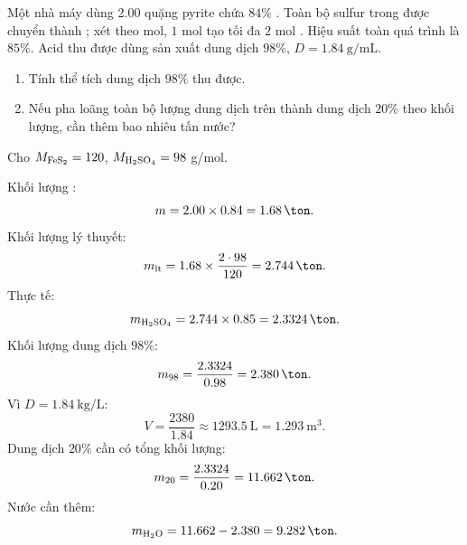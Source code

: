 \begin{tuluyen}
Một nhà máy dùng \SI{2.00}{\ton} quặng pyrite chứa \(84\%\) . Toàn bộ sulfur trong  được chuyển thành ; xét theo mol, \(1\) mol  tạo tối đa \(2\) mol . Hiệu suất toàn quá trình là \(85\%\). Acid thu được dùng sản xuất dung dịch  \(98\%\), \(D=\SI{1.84}{\gram\per\milli\liter}\).
\begin{enumerate}
\item Tính thể tích dung dịch  \(98\%\) thu được.
\item Nếu pha loãng toàn bộ lượng dung dịch trên thành dung dịch  \(20\%\) theo khối lượng, cần thêm bao nhiêu tấn nước?
\end{enumerate}
Cho \(M_{\ce{FeS2}}=120\), \(M_{\ce{H2SO4}}=98\) g/mol.
\begin{loigiaiBT}
Khối lượng :
\[
m=2.00\times0.84=\SI{1.68}{\ton}.
\]
Khối lượng  lý thuyết:
\[
m_{\mathrm{lt}}=1.68\times\frac{2\cdot98}{120}=\SI{2.744}{\ton}.
\]
Thực tế:
\[
m_{\ce{H2SO4}}=2.744\times0.85=\SI{2.3324}{\ton}.
\]
Khối lượng dung dịch \(98\%\):
\[
m_{98}=\frac{2.3324}{0.98}=\SI{2.380}{\ton}.
\]
Vì \(D=\SI{1.84}{\kilo\gram\per\liter}\):
\[
V=\frac{2380}{1.84}\approx\SI{1293.5}{\liter}
=\SI{1.293}{\cubic\metre}.
\]
Dung dịch \(20\%\) cần có tổng khối lượng:
\[
m_{20}=\frac{2.3324}{0.20}=\SI{11.662}{\ton}.
\]
Nước cần thêm:
\[
m_{\ce{H2O}}=11.662-2.380=\SI{9.282}{\ton}.
\]
\end{loigiaiBT}
\end{tuluyen}

